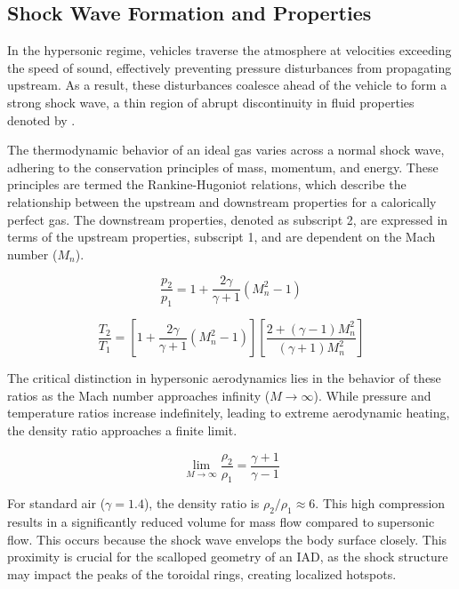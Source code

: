 \subsection{Shock Wave Formation and Properties}


In the hypersonic regime, vehicles traverse the atmosphere at velocities exceeding the speed of sound, effectively preventing pressure disturbances from propagating upstream. As a result, these disturbances coalesce ahead of the vehicle to form a strong shock wave, a thin region of abrupt discontinuity in fluid properties denoted by \cite{AndersonHypersonic}.
\par
The thermodynamic behavior of an ideal gas varies across a normal shock wave, adhering to the conservation principles of mass, momentum, and energy. These principles are termed the Rankine-Hugoniot relations, which describe the relationship between the upstream and downstream properties for a calorically perfect gas. The downstream properties, denoted as subscript 2, are expressed in terms of the upstream properties, subscript 1, and are dependent on the Mach number ($M_n$).
\par
\begin{equation}
    \frac{p_2}{p_1} = 1 + \frac{2\gamma}{\gamma + 1} (M_n^2 - 1)
\end{equation}

\begin{equation}
    \frac{T_2}{T_1} = \left[1 + \frac{2\gamma}{\gamma + 1} (M_n^2 - 1)\right] \left[ \frac{2 + (\gamma - 1)M_n^2}{(\gamma + 1)M_n^2} \right]
\end{equation}

The critical distinction in hypersonic aerodynamics lies in the behavior of these ratios as the Mach number approaches infinity ($M \to \infty$). While pressure and temperature ratios increase indefinitely, leading to extreme aerodynamic heating, the density ratio approaches a finite limit.

\begin{equation}
    \lim_{M \to \infty} \frac{\rho_2}{\rho_1} = \frac{\gamma + 1}{\gamma - 1}
\end{equation}

For standard air ($\gamma = 1.4$), the density ratio is $\rho_2/\rho_1 \approx 6$. This high compression results in a significantly reduced volume for mass flow compared to supersonic flow. This occurs because the shock wave envelops the body surface closely. This proximity is crucial for the scalloped geometry of an IAD, as the shock structure may impact the peaks of the toroidal rings, creating localized hotspots.

